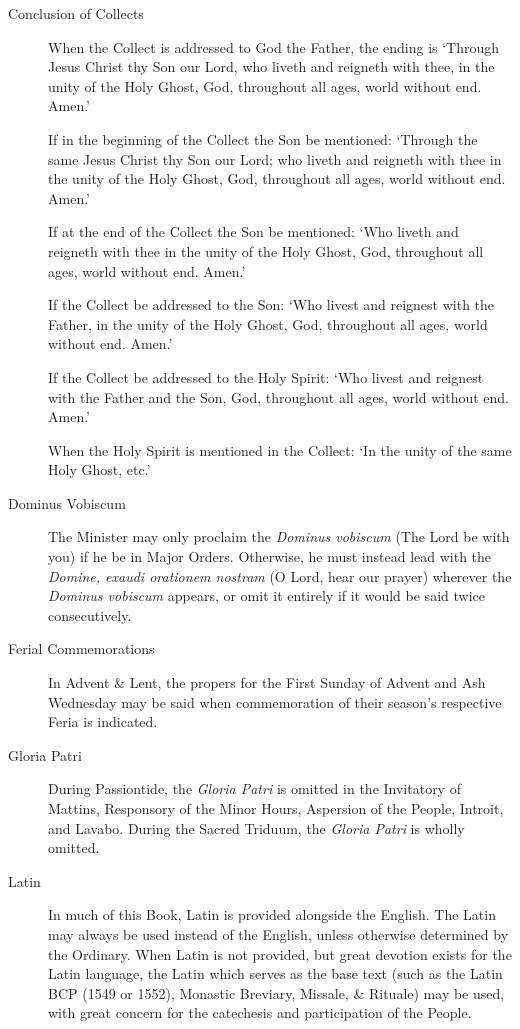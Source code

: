 \begin{description}
\item[Conclusion of Collects] When the Collect is addressed to God the Father, the ending is `Through Jesus Christ thy Son our Lord, who liveth and reigneth with thee, in the unity of the Holy Ghost, God, throughout all ages, world without end. Amen.'\par
If in the beginning of the Collect the Son be mentioned: `Through the same Jesus Christ thy Son our Lord; who liveth and reigneth with thee in the unity of the Holy Ghost, God, throughout all ages, world without end. Amen.'\par
If at the end of the Collect the Son be mentioned: `Who liveth and reigneth with thee in the unity of the Holy Ghost, God, throughout all ages, world without end. Amen.'\par
If the Collect be addressed to the Son: `Who livest and reignest with the Father, in the unity of the Holy Ghost, God, throughout all ages, world without end. Amen.'\par
If the Collect be addressed to the Holy Spirit: `Who livest and reignest with the Father and the Son, God, throughout all ages, world without end. Amen.'\par
When the Holy Spirit is mentioned in the Collect: `In the unity of the same Holy Ghost, etc.'
\item[Dominus Vobiscum] The Minister may only proclaim the \emph{Dominus vobiscum} (The Lord be with you) if he be in Major Orders. Otherwise, he must instead lead with the \emph{Domine, exaudi orationem nostram} (O Lord, hear our prayer) wherever the \emph{Dominus vobiscum} appears, or omit it entirely if it would be said twice consecutively.
\item[Ferial Commemorations] In Advent \& Lent, the propers for the First Sunday of Advent and Ash Wednesday may be said when commemoration of their season's respective Feria is indicated.
\item[Gloria Patri] During Passiontide, the \emph{Gloria Patri} is omitted in the Invitatory of Mattins, Responsory of the Minor Hours, Aspersion of the People, Introit, and Lavabo. During the Sacred Triduum, the \emph{Gloria Patri} is wholly omitted.
\item[Latin] In much of this Book, Latin is provided alongside the English. The Latin may always be used instead of the English, unless otherwise determined by the Ordinary. When Latin is not provided, but great devotion exists for the Latin language, the Latin which serves as the base text (such as the Latin BCP (1549 or 1552), Monastic Breviary, Missale, \& Rituale) may be used, with great concern for the catechesis and participation of the People.

\end{description}

